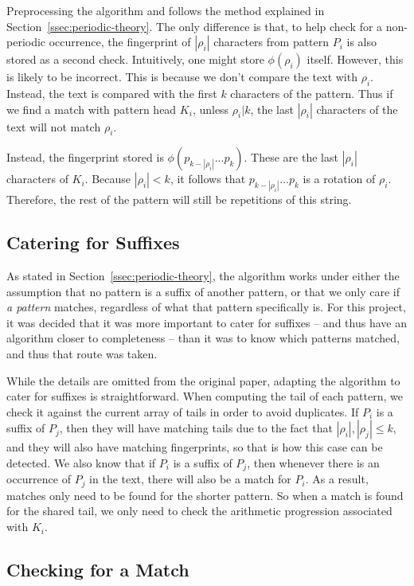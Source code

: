 \documentclass[ %
                    author={Dominic Joseph Moylett},
                    degree={MEng},
                     title={Dictionary Matching with Fingerprints},
                  subtitle={An Empirical Analysis},
                      type={research},
                      year={2015} ]{dissertation}
\begin{document}
Preprocessing the algorithm and follows the method explained in Section~\ref{ssec:periodic-theory}. The only difference is that, to help check for a non-periodic occurrence, the fingerprint of $|\rho_i|$ characters from pattern $P_i$ is also stored as a second check. Intuitively, one might store $\phi(\rho_i)$ itself. However, this is likely to be incorrect. This is because we don't compare the text with $\rho_i$. Instead, the text is compared with the first $k$ characters of the pattern. Thus if we find a match with pattern head $K_i$, unless $\rho_i | k$, the last $|\rho_i|$ characters of the text will not match $\rho_i$.

Instead, the fingerprint stored is $\phi(p_{k - |\rho_i|}...p_k)$. These are the last $|\rho_i|$ characters of $K_i$. Because $|\rho_i| < k$, it follows that $p_{k - |\rho_i|}...p_k$ is a rotation of $\rho_i$. Therefore, the rest of the pattern will still be repetitions of this string.

\subsection{Catering for Suffixes}

As stated in Section~\ref{ssec:periodic-theory}, the algorithm works under either the assumption that no pattern is a suffix of another pattern, or that we only care if \textit{a pattern} matches, regardless of what that pattern specifically is. For this project, it was decided that it was more important to cater for suffixes -- and thus have an algorithm closer to completeness -- than it was to know which patterns matched, and thus that route was taken.

While the details are omitted from the original paper, adapting the algorithm to cater for suffixes is straightforward. When computing the tail of each pattern, we check it against the current array of tails in order to avoid duplicates. If $P_i$ is a suffix of $P_j$, then they will have matching tails due to the fact that $|\rho_i|, |\rho_j| \leq k$, and they will also have matching fingerprints, so that is how this case can be detected. We also know that if $P_i$ is a suffix of $P_j$, then whenever there is an occurrence of $P_j$ in the text, there will also be a match for $P_i$. As a result, matches only need to be found for the shorter pattern. So when a match is found for the shared tail, we only need to check the arithmetic progression associated with $K_i$.

\subsection{Checking for a Match}
\end{document}
